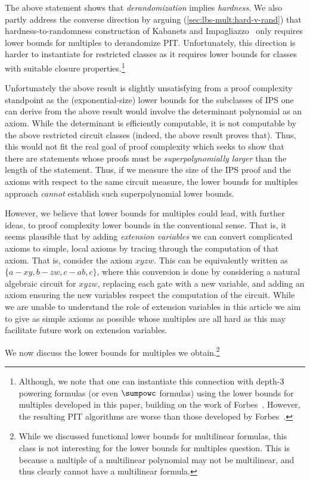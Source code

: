 \documentclass{toc}
\begin{document}
The above statement shows that \emph{derandomization} implies \emph{hardness}.  We also partly address the converse direction by arguing (\autoref{sec:lbs-mult:hard-v-rand}) that hardness-to-randomness construction of Kabanets and Impagliazzo~\cite{KabanetsImpagliazzo04} only requires lower bounds for multiples to derandomize PIT\@.  Unfortunately, this direction is harder to instantiate for restricted classes as it requires lower bounds for classes with suitable closure properties.\footnote{Although, we note that one can instantiate this connection with depth-3 powering formulas (or even $\sumpowc$ formulas) using the lower bounds for multiples developed in this paper, building on the work of Forbes~\cite{Forbes15}.  However, the resulting PIT algorithms are worse than those developed by Forbes~\cite{Forbes15}.}

Unfortunately the above result is slightly unsatisfying from a proof complexity standpoint as the (exponential-size) lower bounds for the subclasses of IPS one can derive from the above result would involve the determinant polynomial as an axiom.  While the determinant is efficiently computable, it is not computable by the above restricted circuit classes (indeed, the above result proves that).
Thus, %
this would not fit the real goal of proof complexity which seeks to show that there are statements whose proofs must be
%
\emph{superpolynomially larger}  %
than the length of the statement.  Thus, if we measure the size of the IPS proof and the axioms with respect to the same circuit measure, the lower bounds for multiples approach \emph{cannot} establish such superpolynomial lower bounds. %

However, we believe that lower bounds for multiples could lead, with further ideas, to proof complexity lower bounds in the conventional sense.  That is, it seems plausible that by adding \emph{extension variables} we can convert complicated axioms to simple, local axioms by tracing through the computation of that axiom.  That is, consider the axiom $xyzw$.  This can be equivalently written as $\{a-xy,b-zw,c-ab,c\}$, where this conversion is done by considering a natural algebraic circuit for $xyzw$, replacing each gate with a new variable, and adding an axiom ensuring the new variables respect the computation of the circuit.  While we are unable to understand the role of extension variables in this article
we aim to give as simple axioms as possible whose multiples
are all hard as this may facilitate future work on extension variables.

We now discuss the lower bounds for multiples we obtain.\footnote{While we discussed functional lower bounds for multilinear formulas, this class is not interesting for the lower bounds for multiples question.  This is because a multiple of a multilinear polynomial may not be multilinear, and thus clearly cannot have a multilinear formula.}
\end{document}
